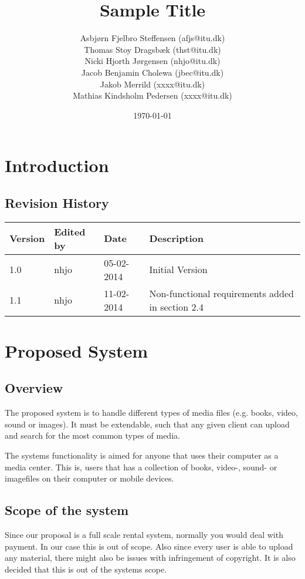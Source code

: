 \documentclass{report}
\title{Sample Title}
\date{\today}
\author{Asbj\o rn Fjelbro Steffensen (afjs@itu.dk)\\ Thomas Stoy Dragsb\ae k (thst@itu.dk)\\ Nicki Hjorth J\o rgensen (nhjo@itu.dk)\\ Jacob Benjamin Cholewa (jbec@itu.dk)\\ Jakob Merrild (xxxx@itu.dk)\\ Mathias Kindsholm Pedersen (xxxx@itu.dk)}
\begin{document}
\maketitle
\newpage
\tableofcontents

\chapter{Introduction}

\section{Revision History}
\begin{center}
\begin{tabularx}{\textwidth}{|l|l|l|X|}
\hline
\textbf{Version} & \textbf{Edited by} & \textbf{Date} & \textbf{Description} \\
\hline
1.0 & nhjo & 05-02-2014 & Initial Version \\
\hline
1.1 & nhjo & 11-02-2014 & Non-functional requirements added in section 2.4 \\
\hline

\end{tabularx}
\end{center}

\chapter{Proposed System}

\section{Overview}
The proposed system is to handle different types of media files (e.g. books, video, sound or images). It must be extendable, such that any given client can upload and search for the most common types of media.

The systems functionality is aimed for anyone that uses their computer as a media center. This is, users that has a collection of books, video-, sound- or imagefiles on their computer or mobile devices.

\section{Scope of the system}

Since our proposal is a full scale rental system, normally you would deal with payment. In our case this is out of scope. Also since every user is able to upload any material, there might also be  issues with infringement of copyright. It is also decided that this is out of the systems scope.
\end{document}
